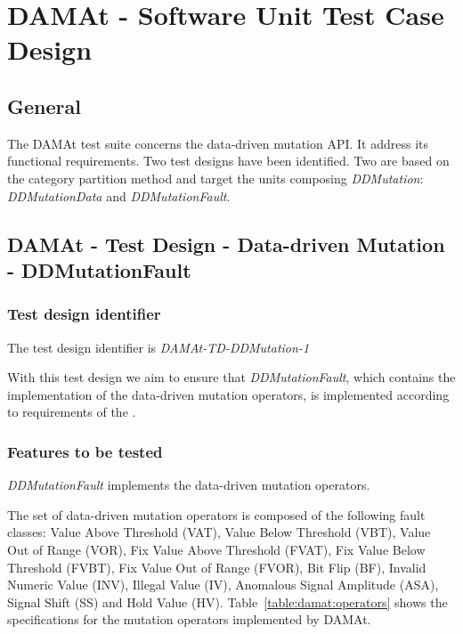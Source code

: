 
\chapter{DAMAt - Software Unit Test Case Design}
\label{chap:design_DAMAt}


\section{General}

The DAMAt test suite concerns the data-driven mutation API. It address its functional requirements. Two test designs have been identified. Two are based on the category partition method and target the units composing \emph{DDMutation}: \emph{DDMutationData} and \emph{DDMutationFault}.

\section{DAMAt - Test Design - Data-driven Mutation - DDMutationFault}

\subsection{Test design identifier}

The test design identifier is \emph{DAMAt-TD-DDMutation-1}

With this test design we aim to ensure that \emph{DDMutationFault}, which contains the implementation of the data-driven mutation operators, is implemented according to requirements of the \FAQAS.

\subsection{Features to be tested}

\emph{DDMutationFault} implements the data-driven mutation operators.

The set of data-driven mutation operators  is composed of the following fault classes: Value Above Threshold (VAT), Value Below Threshold (VBT), Value Out of Range (VOR), Fix Value Above Threshold (FVAT), Fix Value Below Threshold (FVBT), Fix Value Out of Range (FVOR),  Bit Flip (BF), Invalid Numeric Value (INV), Illegal Value (IV), Anomalous Signal Amplitude (ASA), Signal Shift (SS) and Hold Value (HV).
Table~\ref{table:damat:operators} shows the specifications for the mutation operators implemented by DAMAt.


